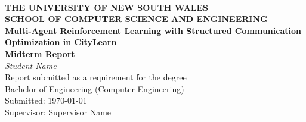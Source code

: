 ﻿\begin{center} ~
\vspace*{2cm} \\
\textbf{\large THE UNIVERSITY OF NEW SOUTH WALES} \\[1ex]
\textbf{\large SCHOOL OF COMPUTER SCIENCE AND ENGINEERING} \\[3cm]
\textbf{\Huge Multi-Agent Reinforcement Learning with Structured Communication Optimization in CityLearn} \\[1.5cm]
\textbf{\Large Midterm Report} \\[1.5cm]
\textit{\huge Student Name} \\[2cm]
{\Large
Report submitted as a requirement for the degree\\
Bachelor of Engineering (Computer Engineering) \\[2ex]
Submitted: \today \\[2ex]
Supervisor: Supervisor Name
}
\end{center}
